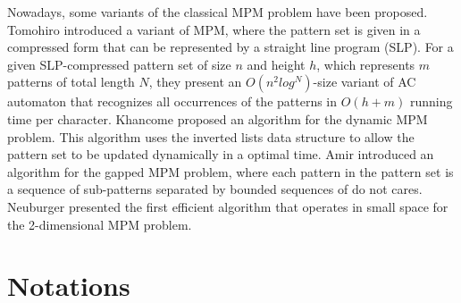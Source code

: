 \documentclass{article}
\begin{document}
Nowadays, some variants of the classical MPM problem have been
proposed. Tomohiro \cite{I2015} introduced a variant of MPM, where the
pattern set is given in a compressed form that can be represented by a
straight line program (SLP). For a given SLP-compressed pattern set of
size $n$ and height $h$, which represents $m$ patterns of total length
$N$, they present an $O(n^2log^N)$-size variant of AC automaton that
recognizes all occurrences of the patterns in $O(h + m)$ running time
per character. Khancome \cite{Khancome2013} proposed an algorithm for
the dynamic MPM problem. This algorithm uses the \textsf{inverted
  lists} data structure to allow the pattern set to be updated
dynamically in a optimal time. Amir \cite{Amir2015} introduced an
algorithm for the gapped MPM problem, where each pattern in the
pattern set is a sequence of sub-patterns separated by bounded
sequences of do not cares. Neuburger \cite{Neuburger2012} presented
the first efficient algorithm that operates in small space for the
2-dimensional MPM problem.

\section{Notations}
\label{sec:notations}
\end{document}

